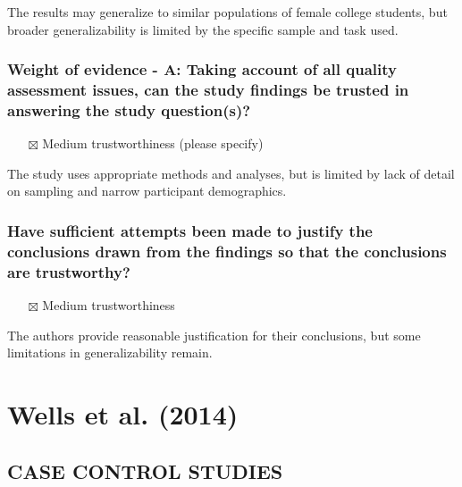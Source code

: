 \documentclass[
  doc, a4paper]{apa7}
\providecommand{\tightlist}{%
  \setlength{\itemsep}{0pt}\setlength{\parskip}{0pt}}
\begin{document}
The results may generalize to similar populations of female college students, but broader generalizability is limited by the specific sample and task used.

\subsubsection{Weight of evidence - A: Taking account of all quality assessment issues, can the study findings be trusted in answering the study question(s)?}\label{weight-of-evidence---a-taking-account-of-all-quality-assessment-issues-can-the-study-findings-be-trusted-in-answering-the-study-questions}

\begin{itemize}
\tightlist
\item[$\boxtimes$]
  Medium trustworthiness (please specify)
\end{itemize}

The study uses appropriate methods and analyses, but is limited by lack of detail on sampling and narrow participant demographics.

\subsubsection{Have sufficient attempts been made to justify the conclusions drawn from the findings so that the conclusions are trustworthy?}\label{have-sufficient-attempts-been-made-to-justify-the-conclusions-drawn-from-the-findings-so-that-the-conclusions-are-trustworthy}

\begin{itemize}
\tightlist
\item[$\boxtimes$]
  Medium trustworthiness
\end{itemize}

The authors provide reasonable justification for their conclusions, but some limitations in generalizability remain.

\section{Wells et al. (2014)}\label{wellsnewcastleottawascalenos2014}

\subsection{\texorpdfstring{\textbf{CASE CONTROL STUDIES}}{CASE CONTROL STUDIES}}\label{case-control-studies}
\end{document}

